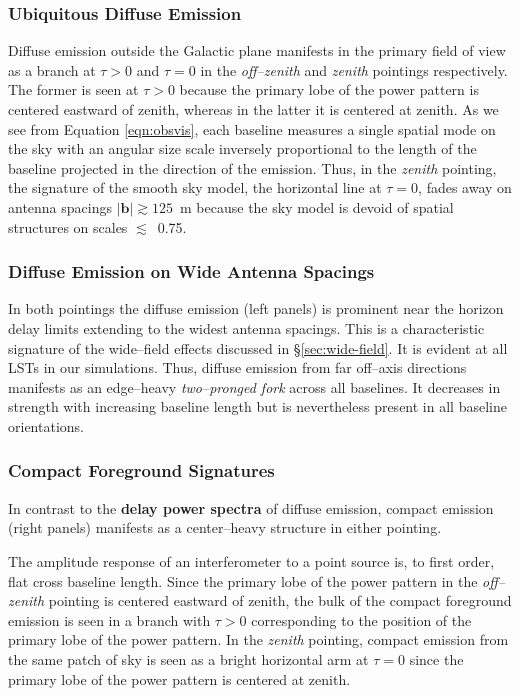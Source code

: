 \documentclass[preprint2,iop,numberedappendix,twocolappendix,appendixfloats]{emulateapj}
\begin{document}
\subsubsection{Ubiquitous Diffuse Emission}\label{sec:diffuse-features}

Diffuse emission outside the Galactic plane manifests in the primary field of view as a branch at $\tau>0$ and $\tau=0$ in the {\it off--zenith} and {\it zenith} pointings respectively. The former is seen at $\tau>0$ because the primary lobe of the power pattern is centered eastward of zenith, whereas in the latter it is centered at zenith. As we see from Equation \ref{eqn:obsvis}, each baseline measures a single spatial mode on the sky with an angular size scale inversely proportional to the length of the baseline projected in the direction of the emission. Thus, in the {\it zenith} pointing, the signature of the smooth sky model, the horizontal line at $\tau=0$, fades away on antenna spacings $|\boldsymbol{b}| \gtrsim 125$~m because the sky model is devoid of spatial structures on scales $\lesssim$~0.75\arcdeg. 

\subsubsection{Diffuse Emission on Wide Antenna Spacings}\label{sec:diffuse-long-baselines}

In both pointings the diffuse emission (left panels) is prominent near the horizon delay limits extending to the widest antenna spacings. This is a characteristic signature of the wide--field effects discussed in \S\ref{sec:wide-field}. It is evident at all LSTs in our simulations. Thus, diffuse emission from far off--axis directions manifests as an edge--heavy {\it two--pronged fork} across all baselines. It decreases in strength with increasing baseline length but is nevertheless present in all baseline orientations.   

\subsubsection{Compact Foreground Signatures}\label{sec:compact}

In contrast to the {\bf delay power spectra} of diffuse emission, compact emission (right panels) manifests as a center--heavy structure in either pointing. 

The amplitude response of an interferometer to a point source is, to first order, flat cross baseline length. Since the primary lobe of the power pattern in the {\it off--zenith} pointing is centered eastward of zenith, the bulk of the compact foreground emission is seen in a branch with $\tau>0$ corresponding to the position of the primary lobe of the power pattern. In the {\it zenith} pointing, compact emission from the same patch of sky is seen as a bright horizontal arm at $\tau=0$ since the primary lobe of the power pattern is centered at zenith. 
\end{document}
